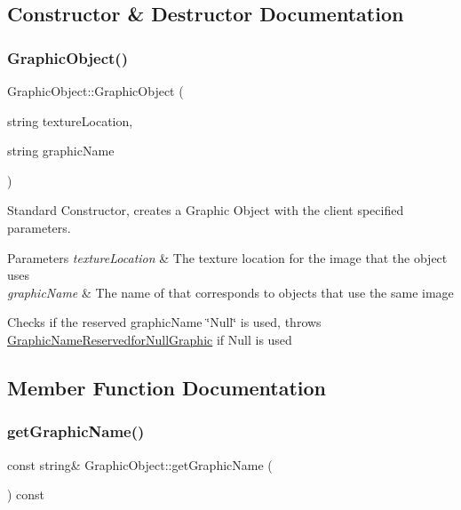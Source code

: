 \subsection{Constructor \& Destructor Documentation}
\mbox{\label{class_graphic_object_a9819ca0b4c1bb72ede070d8485bfc8a9}} 
\subsubsection{\texorpdfstring{Graphic\+Object()}{GraphicObject()}}
{\footnotesize\ttfamily Graphic\+Object\+::\+Graphic\+Object (\begin{DoxyParamCaption}\item[{string}]{texture\+Location,  }\item[{string}]{graphic\+Name }\end{DoxyParamCaption})}



Standard Constructor, creates a Graphic Object with the client specified parameters. 


\begin{DoxyParams}{Parameters}
{\em texture\+Location} & The texture location for the image that the object uses \\
\hline
{\em graphic\+Name} & The name of that corresponds to objects that use the same image\\
\hline
\end{DoxyParams}
Checks if the reserved graphic\+Name \char`\"{}\+Null\char`\"{} is used, throws \hyperlink{class_graphic_name_reservedfor_null_graphic}{Graphic\+Name\+Reservedfor\+Null\+Graphic} if Null is used 

\subsection{Member Function Documentation}
\mbox{\label{class_graphic_object_a8772813296b837e997ee21836e92b028}} 
\subsubsection{\texorpdfstring{get\+Graphic\+Name()}{getGraphicName()}}
{\footnotesize\ttfamily const string\& Graphic\+Object\+::get\+Graphic\+Name (\begin{DoxyParamCaption}{ }\end{DoxyParamCaption}) const\hspace{0.3cm}{\ttfamily [inline]}}



